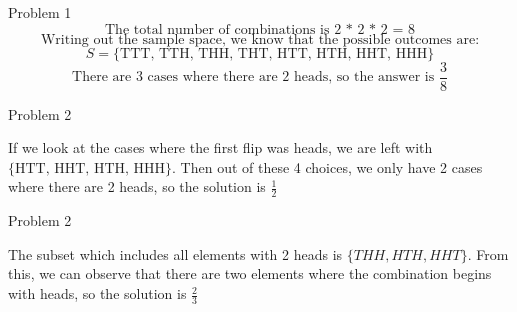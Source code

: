 \documentclass[hidelinks]{article}
\begin{document}
Problem 1
\[
    \text{The total number of combinations is 2 * 2 * 2 = 8}
\]
\[
    \text{Writing out the sample space, we know that the possible outcomes are:}
\]
\[S = \{\text{TTT, TTH, THH, THT, HTT, HTH, HHT, HHH}\}\]
\[
    \text{There are 3 cases where there are 2 heads, so the answer is } \boxed{\frac{3}{8}}
\]
\vspace{0.3cm}

Problem 2 
\begin{center}
    If we look at the cases where the first flip was heads, we are left with $\{\text{HTT, HHT, HTH, HHH}\}$. Then out of these 4 choices, we only have 2 cases where there are 2 heads, so the solution is $\boxed{\frac{1}{2}}$
\end{center}

Problem 2 
\begin{center}
    The subset which includes all elements with 2 heads is $\{THH, HTH, HHT\}$. From this, we can observe that there are two elements where the combination begins with heads, so the solution is $\boxed{\frac{2}{3}}$
\end{center}
\end{document}
